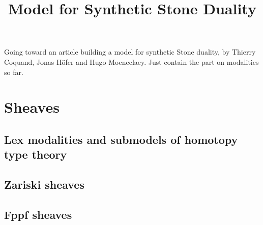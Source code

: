 \documentclass{../util/zariski}
\title{Model for Synthetic Stone Duality}
\begin{document}
\maketitle

Going toward an article building a model for synthetic Stone duality, by Thierry Coquand, Jonas Höfer and Hugo Moeneclaey. Just contain the part on modalities so far.

\tableofcontents

\section{Sheaves}

\subsection{Lex modalities and submodels of homotopy type theory}


\subsection{Zariski sheaves}


\subsection{Fppf sheaves}


%

%

%

%



\printindex

\printbibliography
\end{document}
